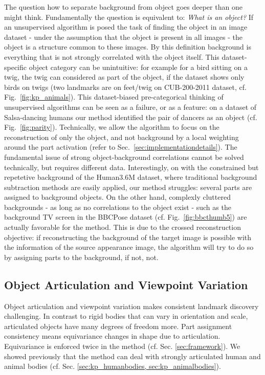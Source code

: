 		The question how to separate background from object goes deeper than one might think. Fundamentally the question is equivalent to: \textit{What is an object?}
		If an unsupervised algorithm is posed the task of finding the object in an image dataset - under the assumption that the object is present in all images - the object is a structure common to these images.
		By this definition background is everything that is not strongly correlated with the object itself.
		This dataset-specific object category can be unintuitive: for example for a bird sitting on a twig, the twig can considered as part of the object, if the dataset shows only birds on twigs (\eg two landmarks are on feet/twig on CUB-200-2011 dataset,  cf. Fig.~\ref{fig:kp_animals}).
		This dataset-biased pre-categorical thinking of unsupervised algorithms can be seen as a failure, or as a feature: on a dataset of Salsa-dancing humans our method identified the pair of dancers as an object (cf. Fig.~\ref{fig:parity}). 
		Technically, we allow the algorithm to focus on the reconstruction of only the object, and not background by a local weighting around the part activation (refer to Sec.~\ref{sec:implementationdetails}). The fundamental issue of strong object-background correlations cannot be solved technically, but requires different data.  Interestingly, on with the constrained but repetetive background of the Human3.6M dataset, where traditional background subtraction methods are easily applied, our method struggles: several parts are assigned to background objects. On the other hand, complexly cluttered backgrounds - as long as no correlations to the object exist - such as the background TV screen in the BBCPose dataset (cf. Fig.~\ref{fig:bbcthumb5}) are actually favorable for the method. This is due to the crossed reconstruction objective: if reconstructing the background of the target image is possible with the information of the source appearance image, the algorithm will try to do so by assigning parts to the background, if not, not.


	\subsection{Object Articulation and Viewpoint Variation}\label{sec:articulation}
		Object articulation and viewpoint variation makes consistent landmark discovery challenging. In contrast to rigid bodies that can vary in orientation and scale, articulated objects have many degrees of freedom more. Part assignment consistency means equivariance \wrt changes in shape due to articulation. Equivariance is enforced twice in the method (cf. Sec. \ref{sec:framework}).
		We showed previously that the method can deal with strongly articulated human and animal bodies (cf. Sec. \ref{sec:kp_humanbodies, sec:kp_animalbodies}).

